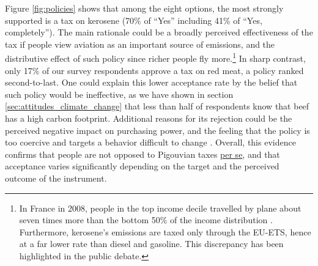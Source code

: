 \documentclass[english,5p,authoryear]{elsarticle}
\begin{document}
Figure \ref{fig:policies} shows that among the eight options, the most strongly supported is a tax on kerosene (70\% of ``Yes'' including 41\% of ``Yes, completely''). The main rationale could be a broadly perceived effectiveness of the tax if people view aviation as an important source of emissions, and the distributive effect of such policy since richer people fly more.\footnote{In France in 2008, people in the top income decile travelled by plane about seven times more than the bottom 50\% of the income distribution \citep{pappalardo_mobilite_2010}. Furthermore, kerosene's emissions are taxed only through the EU-ETS, hence at a far lower rate than diesel and gasoline. This discrepancy has been highlighted in the public debate.} In sharp contrast, only 17\% of our survey respondents approve a tax on red meat, a policy ranked second-to-last. One could explain this lower acceptance rate by the belief that such policy would be ineffective, as we have shown in section \ref{sec:attitudes_climate_change} that less than half of respondents know that beef has a high carbon footprint. Additional reasons for its rejection could be the perceived negative impact on purchasing power, and the feeling that the policy is too coercive and targets a behavior difficult to change \citep{de_groot_schuitema_2012}. Overall, this evidence confirms that people are not opposed to Pigouvian taxes \uline{per se}, and that acceptance varies significantly depending on the target and the perceived outcome of the instrument.
\end{document}
